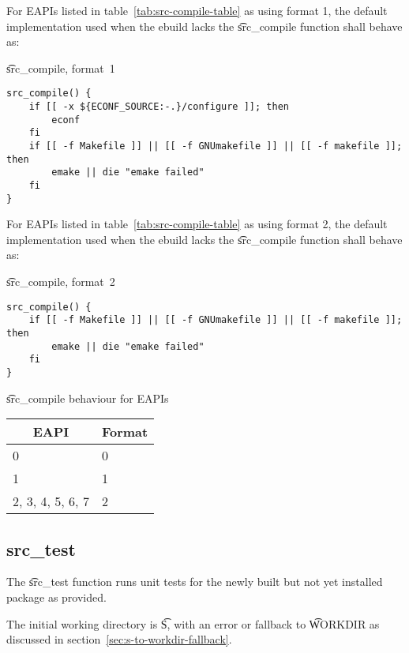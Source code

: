  For EAPIs listed in table~\ref{tab:src-compile-table} as using format
1, the default implementation used when the ebuild lacks the \t{src_compile} function shall behave
as:

\begin{listing}[H]
\caption{\t{src_compile}, format~1}
\begin{verbatim}
src_compile() {
    if [[ -x ${ECONF_SOURCE:-.}/configure ]]; then
        econf
    fi
    if [[ -f Makefile ]] || [[ -f GNUmakefile ]] || [[ -f makefile ]]; then
        emake || die "emake failed"
    fi
}
\end{verbatim}
\end{listing}

 For EAPIs listed in table~\ref{tab:src-compile-table} as using format
2, the default implementation used when the ebuild lacks the \t{src_compile} function shall behave
as:

\begin{listing}[H]
\caption{\t{src_compile}, format~2}
\begin{verbatim}
src_compile() {
    if [[ -f Makefile ]] || [[ -f GNUmakefile ]] || [[ -f makefile ]]; then
        emake || die "emake failed"
    fi
}
\end{verbatim}
\end{listing}

\begin{centertable}{\t{src_compile} behaviour for EAPIs}
    \label{tab:src-compile-table}
    \begin{tabular}{ll}
      \toprule
      \multicolumn{1}{c}{\textbf{EAPI}} &
      \multicolumn{1}{c}{\textbf{Format}} \\
      \midrule
      0                 & 0 \\
      1                 & 1 \\
      2, 3, 4, 5, 6, 7  & 2 \\
      \bottomrule
    \end{tabular}
\end{centertable}

\subsection{src_test}

The \t{src_test} function runs unit tests for the newly built but not yet installed package as
provided.

The initial working directory is \t{S}, with an error or fallback to \t{WORKDIR} as discussed in
section~\ref{sec:s-to-workdir-fallback}.

